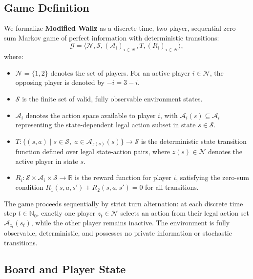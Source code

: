 \documentclass{article}
\begin{document}
\subsection{Game Definition}
\label{subsec:game_definition}

We formalize \textbf{Modified Wallz} as a discrete-time, two-player, sequential zero-sum Markov game of perfect information with deterministic transitions:
\begin{equation}
\mathcal{G} = \big\langle \mathcal{N}, \mathcal{S}, (\mathcal{A}_i)_{i \in \mathcal{N}}, T, (R_i)_{i \in \mathcal{N}} \big\rangle,
\end{equation}
where:
\begin{itemize}
    \item $\mathcal{N} = \{1, 2\}$ denotes the set of players. For an active player $i \in \mathcal{N}$, the opposing player is denoted by $-i = 3 - i$.
    \item $\mathcal{S}$ is the finite set of valid, fully observable environment states.
    \item $\mathcal{A}_i$ denotes the action space available to player $i$, with $\mathcal{A}_i(s) \subseteq \mathcal{A}_i$ representing the state-dependent legal action subset in state $s \in \mathcal{S}$.
    \item $T : \big\{ (s, a) \;\big|\; s \in \mathcal{S}, \; a \in \mathcal{A}_{z(s)}(s) \big\} \rightarrow \mathcal{S}$ is the deterministic state transition function defined over legal state-action pairs, where $z(s) \in \mathcal{N}$ denotes the active player in state $s$.
    \item $R_i : \mathcal{S} \times \mathcal{A}_i \times \mathcal{S} \rightarrow \mathbb{R}$ is the reward function for player $i$, satisfying the zero-sum condition $R_1(s, a, s') + R_2(s, a, s') = 0$ for all transitions.
\end{itemize}
The game proceeds sequentially by strict turn alternation: at each discrete time step $t \in \mathbb{N}_0$, exactly one player $z_t \in \mathcal{N}$ selects an action from their legal action set $\mathcal{A}_{z_t}(s_t)$, while the other player remains inactive. The environment is fully observable, deterministic, and possesses no private information or stochastic transitions.

\subsection{Board and Player State}
\label{subsec:board_player_state}
\end{document}
